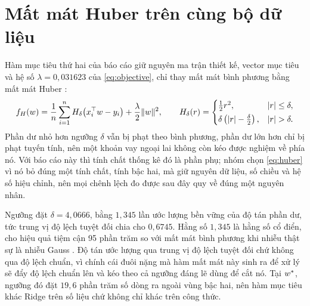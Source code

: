 \documentclass[12pt, a4paper, oneside]{report}
\theoremstyle{definition}
\begin{document}
\section{Mất mát Huber trên cùng bộ dữ liệu}\label{sec:huber-loss}

Hàm mục tiêu thứ hai của báo cáo giữ nguyên ma trận thiết kế, vector mục tiêu và
hệ số $\lambda = 0{,}031623$ của \eqref{eq:objective}, chỉ thay mất mát bình
phương bằng mất mát Huber \cite{huber1964robust}:
\begin{equation}\label{eq:huber}
  f_{H}(w) = \frac{1}{n} \sum_{i=1}^{n} H_{\delta}\!\left( x_i^{\top} w - y_i \right)
    + \frac{\lambda}{2} \lVert w\rVert^{2},
  \qquad
  H_{\delta}(r) =
  \begin{cases}
    \tfrac{1}{2} r^{2}, & \lvert r\rvert \le \delta, \\[2pt]
    \delta \left( \lvert r\rvert - \tfrac{\delta}{2} \right), & \lvert r\rvert > \delta .
  \end{cases}
\end{equation}
Phần dư nhỏ hơn ngưỡng $\delta$ vẫn bị phạt theo bình phương, phần dư lớn hơn chỉ
bị phạt tuyến tính, nên một khoản vay ngoại lai không còn kéo được nghiệm về phía
nó. Với báo cáo này thì tính chất thống kê đó là phần phụ; nhóm chọn
\eqref{eq:huber} vì nó bỏ đúng một tính chất, tính bậc hai, mà giữ nguyên dữ
liệu, số chiều và hệ số hiệu chỉnh, nên mọi chênh lệch đo được sau đây quy về đúng
một nguyên nhân.

Ngưỡng đặt $\delta = 4{,}0666$, bằng $1{,}345$ lần ước lượng bền vững của độ tán
phần dư, tức trung vị độ lệch tuyệt đối chia cho $0{,}6745$. Hằng số $1{,}345$ là
hằng số cổ điển, cho hiệu quả tiệm cận 95 phần trăm so với mất mát bình phương
khi nhiễu thật sự là nhiễu Gauss \cite{huber1964robust}. Độ tán ước lượng qua
trung vị độ lệch tuyệt đối chứ không qua độ lệch chuẩn, vì chính cái đuôi nặng mà
hàm mất mát này sinh ra để xử lý sẽ đẩy độ lệch chuẩn lên và kéo theo cả ngưỡng
đáng lẽ dùng để cắt nó. Tại $w^{*}$, ngưỡng đó đặt $19{,}6$ phần trăm số dòng ra
ngoài vùng bậc hai, nên hàm mục tiêu khác Ridge trên số liệu chứ không chỉ khác
trên công thức.
\end{document}
